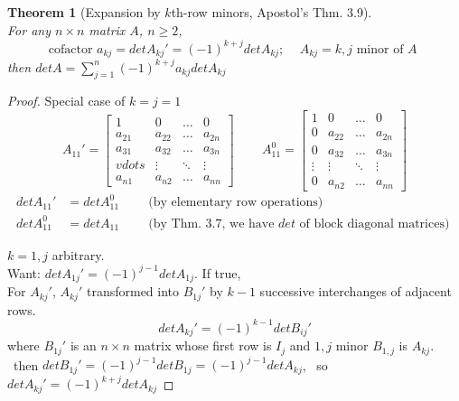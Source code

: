 \documentclass[twoside]{amsart}
\theoremstyle{plain}
\newtheorem{theorem}{Theorem}
\theoremstyle{definition}
\begin{document}
\begin{theorem}[Expansion by $k$th-row minors, Apostol's Thm. 3.9] \quad \\
For any $n\times n$ matrix $A$, $n\geq 2$,  
\[
\text{ cofactor } a_{kj} = det{A_{kj}'} = (-1)^{k+j} det{A_{kj}}; \quad \, A_{kj} = k,j \text{ minor of $A$ } 
\]
then $det{A} = \sum_{j=1}^n (-1)^{k+j} a_{kj} det{A_{kj}}$
\end{theorem}
\begin{proof}
  Special case of $k=j=1$  \\
  \[
A_{11}' = \left[ \begin{matrix} 1 & 0 & \dots & 0 \\ a_{21} & a_{22} & \dots & a_{2n} \\ a_{31} & a_{32} & \dots & a_{3n} \\ vdots & \vdots & \ddots & \vdots \\ a_{n1} & a_{n2} & \dots & a_{nn} \end{matrix} \right] \quad \quad \, A_{11}^0 = \left[ \begin{matrix} 1 & 0 & \dots & 0 \\ 0 & a_{22} & \dots & a_{2n} \\ 0 & a_{32} & \dots & a_{3n} \\ \vdots & \vdots & \ddots & \vdots \\ 0 & a_{n2} & \dots & a_{nn} \end{matrix} \right] 
\]
\[
\begin{aligned}
  det{A_{11}'} & = det{A_{11}^0} \quad \, & \text{ (by elementary row operations) } \\
  det{A_{11}^0} & = det{A_{11}} \quad \, & \text{ (by Thm. 3.7, we have $det$ of block diagonal matrices) }
\end{aligned}
\]

$k=1, j$ arbitrary.  \\
Want: $det{A_{1j}'} = (-1)^{j-1} det{A_{1j}}$.  If true, \\
\quad For $A_{kj}'$, $A_{kj}'$ transformed into $B_{1j}'$ by $k-1$ successive interchanges of adjacent rows. 
\[
det{A_{kj}'} = (-1)^{k-1} det{B_{ij}'} 
\]
\quad where $B_{1j}'$ is an $n\times n$ matrix whose first row is $I_j$ and $1,j$ minor $B_{1,j}$ is $A_{kj}$.  \\
\quad \, then $det{B_{1j}'} = (-1)^{j-1} det{B_{1j}} = (-1)^{j-1} det{A_{kj}}$, 
\quad \, so $det{A_{kj}'} = (-1)^{k+j} det{A_{kj}}$


\end{proof}
\end{document}
